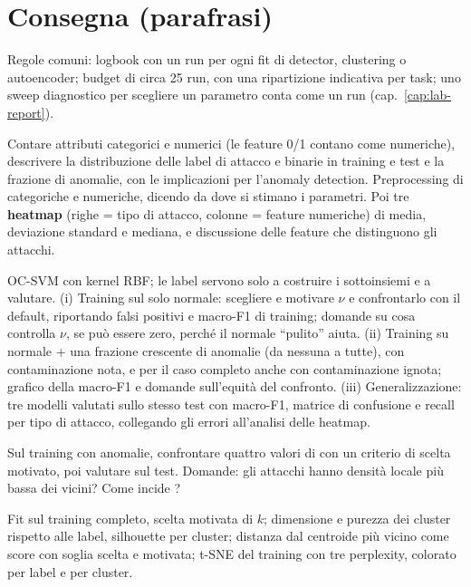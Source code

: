 \section{Consegna (parafrasi)}
Regole comuni: logbook con un run per ogni fit di detector, clustering o autoencoder; budget di circa
25 run, con una ripartizione indicativa per task; uno sweep diagnostico per scegliere un parametro
conta come un run (cap.~\ref{cap:lab-report}).

\begin{description}[style=nextline,leftmargin=1.2em]
\item[Task 1 -- I dati visti da un esperto (nessun run)]
  Contare attributi categorici e numerici (le feature 0/1 contano come numeriche), descrivere la
  distribuzione delle label di attacco e binarie in training e test e la frazione di anomalie, con le
  implicazioni per l'anomaly detection. Preprocessing di categoriche e numeriche, dicendo da dove si
  stimano i parametri. Poi tre \textbf{heatmap} (righe = tipo di attacco, colonne = feature numeriche)
  di media, deviazione standard e mediana, e discussione delle feature che distinguono gli attacchi.
\item[Task 2 -- One-class SVM e impatto delle anomalie]
  OC-SVM con kernel RBF; le label servono solo a costruire i sottoinsiemi e a valutare. (i) Training
  sul solo normale: scegliere e motivare $\nu$ e confrontarlo con il default, riportando falsi positivi
  e macro-F1 di training; domande su cosa controlla $\nu$, se può essere zero, perché il normale
  ``pulito'' aiuta. (ii) Training su normale + una frazione crescente di anomalie (da nessuna a tutte),
  con contaminazione nota, e per il caso completo anche con contaminazione ignota; grafico della
  macro-F1 e domande sull'equità del confronto. (iii) Generalizzazione: tre modelli valutati sullo
  stesso test con macro-F1, matrice di confusione e recall per tipo di attacco, collegando gli
  errori all'analisi delle heatmap.
\item[Task 3 -- Local Outlier Factor]
  Sul training con anomalie, confrontare quattro valori di  con un criterio di
  scelta motivato, poi valutare sul test. Domande: gli attacchi hanno densità locale più bassa dei
  vicini? Come incide ?
\item[Task 4A -- K-means]
  Fit sul training completo, scelta motivata di $k$; dimensione e purezza dei cluster rispetto alle
  label, silhouette per cluster; distanza dal centroide più vicino come score con soglia scelta e
  motivata; t-SNE del training con tre perplexity, colorato per label e per cluster.

\end{description}

